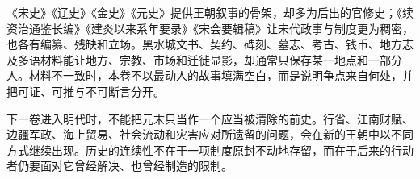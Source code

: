 《宋史》《辽史》《金史》《元史》提供王朝叙事的骨架，却多为后出的官修史；《续资治通鉴长编》《建炎以来系年要录》《宋会要辑稿》让宋代政事与制度更为稠密，也各有编纂、残缺和立场。黑水城文书、契约、碑刻、墓志、考古、钱币、地方志及多语材料能让地方、宗教、市场和迁徙显影，却通常只保存某一地点和一部分人。材料不一致时，本卷不以最动人的故事填满空白，而是说明争点来自何处，并把可证、可推与不可断言分开。

下一卷进入明代时，不能把元末只当作一个应当被清除的前史。行省、江南财赋、边疆军政、海上贸易、社会流动和灾害应对所遗留的问题，会在新的王朝中以不同方式继续出现。历史的连续性不在于一项制度原封不动地存留，而在于后来的行动者仍要面对它曾经解决、也曾经制造的限制。

